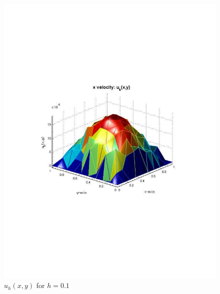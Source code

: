 \documentclass[12pt]{article}
\begin{document}
                \begin{figure}[htb]
                    \begin{center}
                \includegraphics[scale=0.50]{./../files/box/1u.pdf}
                \caption{$u_h(x,y)$ for $h = 0.1$}
            \end{center}
            \end{figure}
\end{document}
